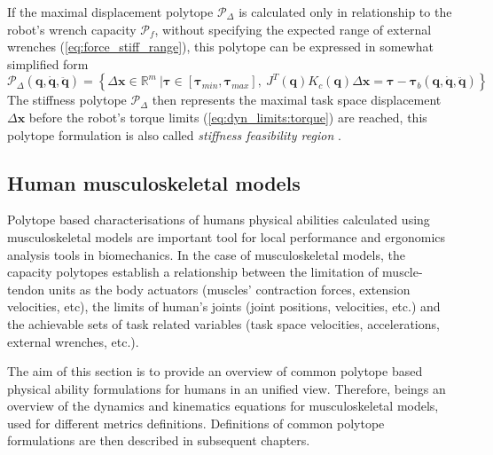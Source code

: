 If the maximal displacement polytope $\mathcal{P}_\Delta$ is calculated only in relationship to the robot's wrench capacity $\mathcal{P}_f$, without specifying the expected range of external wrenches (\ref{eq:force_stiff_range}), this polytope can be expressed in somewhat simplified form
\begin{equation}
    \mathcal{P}_\Delta(\bm{q},\dot{\bm{q}},\ddot{\bm{q}}) =\! \left\{ \Delta\bm{x} \in \mathbb{R}^m ~|\bm{\tau}\in\left[\bm{\tau}_{min}, \bm{\tau}_{max} \right]\!,\! ~ J^T(\bm{q})K_c(\bm{q})\Delta\bm{x}\!= \bm{\tau}\! -\! \bm{\tau}_b(\bm{q},\dot{\bm{q}},\ddot{\bm{q}}) \right\}
    \label{eq:pol_sfr_rob}
\end{equation}
The stiffness polytope $\mathcal{P}_\Delta$ then represents the maximal task space displacement $\Delta \bm{x}$ before the robot's torque limits (\ref{eq:dyn_limits:torque}) are reached, this polytope formulation is also called \textit{stiffness feasibility region} \cite{ajoudani2017choosing,ajoudani2015role}.

\subsection{Human musculoskeletal models}
\label{ch:human_metrics}
Polytope based characterisations of humans physical abilities calculated using musculoskeletal models are important tool for local performance and ergonomics analysis tools in biomechanics. In the case of musculoskeletal models, the capacity polytopes establish a relationship between the limitation of muscle-tendon units as the body actuators (muscles' contraction forces,  extension velocities, etc), the limits of human's joints (joint positions, velocities, etc.) and the achievable sets of task related variables (task space velocities, accelerations, external wrenches, etc.).

The aim of this section is to provide an overview of common polytope based physical ability formulations for humans in an unified view. Therefore,  beings an overview of the dynamics and kinematics equations for musculoskeletal models, used for different metrics definitions. Definitions of common polytope formulations are then described in subsequent chapters.

